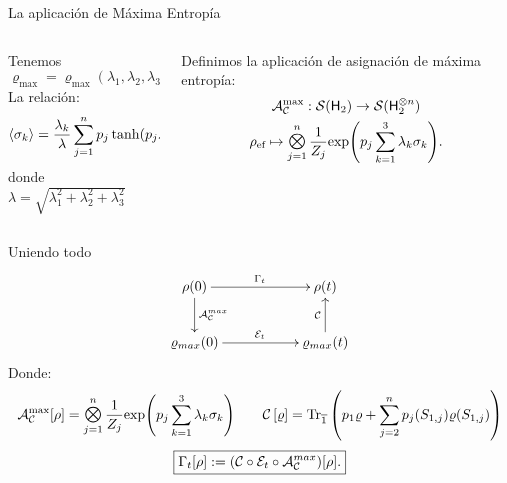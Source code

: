 \begin{frame}{La aplicación de Máxima Entropía}
    \begin{columns}
        \begin{column}{0.5\textwidth}
            Tenemos
            \begin{equation}
                \varrho_{\max}=\varrho_{\max}(\lambda_{1},\lambda_{2},\lambda_{3})\nonumber
            \end{equation}\pause
            La relación:
            \begin{equation}
                \expval{\sigma_{k}}=\frac{\lambda_{k}}{\lambda}\sum_{j=1}^{n}p_{j}\tanh(p_{j}\lambda)\nonumber
            \end{equation}\pause
            donde $\lambda=\sqrt{\lambda_{1}^{2}+\lambda_{2}^{2}+\lambda_{3}^{2}}$
        \end{column}
        \pause
        \begin{column}{0.5\textwidth}
            Definimos la aplicación de asignación de máxima entropía:
            \begin{equation}
                \begin{gathered}
                    \mcA_{\mcC}^{\max}:\densityspace{2}\rightarrow\mcS(\hilbert_{2}^{\otimes n})\nonumber\\
                    \rho_{\ef} \mapsto \Motimes_{j=1}^{n}\frac{1}{Z_{j}}\text{exp}\qty(p_{j}\sum_{k=1}^{3}\lambda_{k}\sigma_{k}).
                \end{gathered}
            \end{equation}
        \end{column}
    \end{columns}
\end{frame}


\begin{frame}{Uniendo todo}
    \begin{displaymath}
        \xymatrix{
          {\rho(0)} \ar[rr]^{\Gamma_{t}} \ar[d]^{\mcA^{max}_{\mcC}}
          && {\rho(t)}\\
          {\varrho_{max}(0)} \ar[rr]^{\mcE_{t}}
          && {\varrho_{max}(t)} \ar[u]^{\mcC}
        }
      \end{displaymath}\pause
      Donde:
        \begin{equation}
            \mcA_{\mcC}^{\max}[\rho]=\Motimes_{j=1}^{n}\frac{1}{Z_{j}}\text{exp}\qty(p_{j}\sum_{k=1}^{3}\lambda_{k}\sigma_{k}) \qquad \CG{\varrho}=\Tr_{\overline{1}}\qty(p_{1}\varrho+\sum_{j=2}^{n}p_{j}(S_{1,j})\varrho(S_{1,j}))\nonumber
        \end{equation}\pause
        \begin{equation}
            \boxed{\Gamma_t[\rho]:=(\mathcal{C} \circ \mathcal{E}_t \circ \mathcal{A}^{max}_{\mathcal{C}})[\rho].}\nonumber
        \end{equation}
\end{frame}
